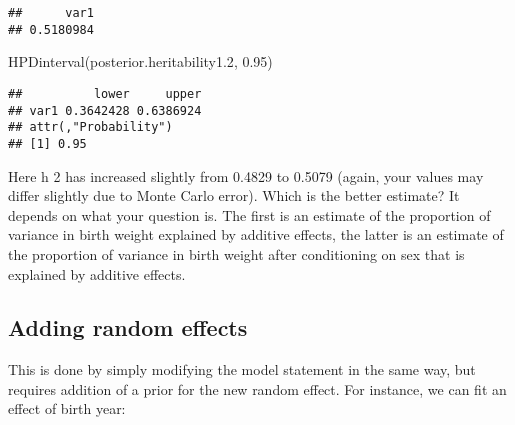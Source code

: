 \documentclass[
  12pt,
]{book}
\newenvironment{Shaded}{\begin{snugshade}}{\end{snugshade}}
\newcommand{\FloatTok}[1]{\textcolor[rgb]{0.00,0.00,0.81}{#1}}
\newcommand{\FunctionTok}[1]{\textcolor[rgb]{0.00,0.00,0.00}{#1}}
\newcommand{\NormalTok}[1]{#1}
\newcommand{\OtherTok}[1]{\textcolor[rgb]{0.56,0.35,0.01}{#1}}
\newcommand{\SpecialCharTok}[1]{\textcolor[rgb]{0.00,0.00,0.00}{#1}}
\newcommand{\StringTok}[1]{\textcolor[rgb]{0.31,0.60,0.02}{#1}}
\begin{document}
\begin{Shaded}
\end{Shaded}

\begin{verbatim}
##      var1 
## 0.5180984
\end{verbatim}

\begin{Shaded}
\begin{Highlighting}[]
\FunctionTok{HPDinterval}\NormalTok{(posterior.heritability1}\FloatTok{.2}\NormalTok{, }\FloatTok{0.95}\NormalTok{)}
\end{Highlighting}
\end{Shaded}

\begin{verbatim}
##          lower     upper
## var1 0.3642428 0.6386924
## attr(,"Probability")
## [1] 0.95
\end{verbatim}

Here h 2 has increased slightly from 0.4829 to 0.5079 (again, your values may differ slightly due to Monte Carlo error). Which is the better estimate? It depends on what your question is. The first is an estimate of the proportion of variance in birth weight explained by additive effects, the latter is an estimate of the proportion of variance in birth weight after conditioning on sex that is explained by additive effects.

\hypertarget{adding-random-effects-1}{%
\subsection{Adding random effects}\label{adding-random-effects-1}}

This is done by simply modifying the model statement in the same way, but requires addition of a prior for the new random effect. For instance, we can fit an effect of birth year:
\end{document}
